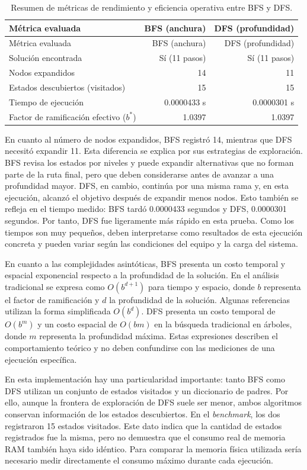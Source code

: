 \documentclass[
  spanish,
  11pt,
]{article}
\begin{document}
\begin{longtable}[]{@{}lrr@{}}
\caption{Resumen de métricas de rendimiento y eficiencia operativa entre
BFS y DFS.}\label{tbl-benchmark}\tabularnewline
\toprule\noalign{}
Métrica evaluada & BFS (anchura) & DFS (profundidad) \\
\midrule\noalign{}
\endfirsthead
\toprule\noalign{}
Métrica evaluada & BFS (anchura) & DFS (profundidad) \\
\midrule\noalign{}
\endhead
\bottomrule\noalign{}
\endlastfoot
Solución encontrada & Sí (11 pasos) & Sí (11 pasos) \\
Nodos expandidos & 14 & 11 \\
Estados descubiertos (visitados) & 15 & 15 \\
Tiempo de ejecución & 0.0000433 s & 0.0000301 s \\
Factor de ramificación efectivo (\(b^{*}\)) & 1.0397 & 1.0397 \\
\end{longtable}

En cuanto al número de nodos expandidos, BFS registró 14, mientras que
DFS necesitó expandir 11. Esta diferencia se explica por sus estrategias
de exploración. BFS revisa los estados por niveles y puede expandir
alternativas que no forman parte de la ruta final, pero que deben
considerarse antes de avanzar a una profundidad mayor. DFS, en cambio,
continúa por una misma rama y, en esta ejecución, alcanzó el objetivo
después de expandir menos nodos. Esto también se refleja en el tiempo
medido: BFS tardó 0.0000433 segundos y DFS, 0.0000301 segundos. Por
tanto, DFS fue ligeramente más rápido en esta prueba. Como los tiempos
son muy pequeños, deben interpretarse como resultados de esta ejecución
concreta y pueden variar según las condiciones del equipo y la carga del
sistema.

En cuanto a las complejidades asintóticas, BFS presenta un costo
temporal y espacial exponencial respecto a la profundidad de la
solución. En el análisis tradicional se expresa como \(O(b^{d+1})\) para
tiempo y espacio, donde \(b\) representa el factor de ramificación y
\(d\) la profundidad de la solución. Algunas referencias utilizan la
forma simplificada \(O(b^d)\). DFS presenta un costo temporal de
\(O(b^m)\) y un costo espacial de \(O(bm)\) en la búsqueda tradicional
en árboles, donde \(m\) representa la profundidad máxima. Estas
expresiones describen el comportamiento teórico y no deben confundirse
con las mediciones de una ejecución específica.

En esta implementación hay una particularidad importante: tanto BFS como
DFS utilizan un conjunto de estados visitados y un diccionario de
padres. Por ello, aunque la frontera de exploración de DFS suele ser
menor, ambos algoritmos conservan información de los estados
descubiertos. En el \emph{benchmark}, los dos registraron 15 estados
visitados. Este dato indica que la cantidad de estados registrados fue
la misma, pero no demuestra que el consumo real de memoria RAM también
haya sido idéntico. Para comparar la memoria física utilizada sería
necesario medir directamente el consumo máximo durante cada ejecución.
\end{document}
